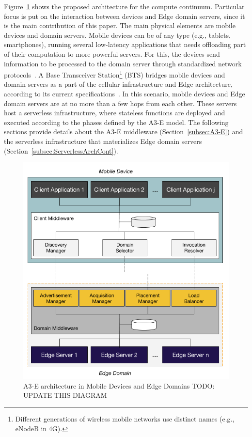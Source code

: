 Figure~\ref{fig:reference-architecture} shows the proposed architecture for the compute continuum. Particular focus is put on the interaction between devices and Edge domain servers, since it is the main contribution of this paper. 
The main physical elements are mobile devices and domain servers. Mobile devices can be of any type (e.g., tablets, smartphones), running several low-latency applications that needs offloading part of their computation to more powerful servers. For this, the devices send information to be processed to the domain server through standardized network protocols~\cite{Sill17standards}.  A Base Transceiver Station\footnote{Different generations of wireless mobile networks use distinct names (e.g., eNodeB in 4G).} (BTS) bridges mobile devices and domain servers as a part of the cellular infrastructure and  Edge architecture, according to its current specifications~\cite{hu2015mobile}. In this scenario, mobile devices and Edge domain servers are at no more than a few hops from each other. These servers host a serverless infrastructure, where stateless functions are deployed and executed according to the phases defined by the A3-E model. 
The following sections provide details about the A3-E middleware (Section~\ref{subsec:A3-E}) and the serverless infrastructure that materializes Edge domain servers (Section~\ref{subsec:ServerlessArchCont}).

\begin{figure}[tbp]
	\includegraphics[width=.6\textwidth]{figs/reference-architecture.png}
	\caption{A3-E architecture in Mobile Devices and Edge Domains TODO: UPDATE THIS DIAGRAM}
	\label{fig:reference-architecture}
	\end{figure}